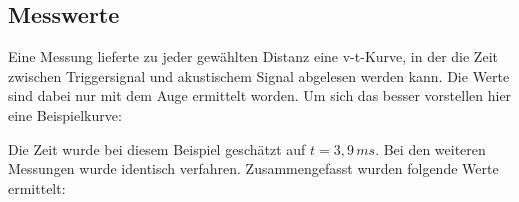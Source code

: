 \subsection{Messwerte}
Eine Messung lieferte zu jeder gewählten Distanz eine v-t-Kurve, in der die Zeit zwischen Triggersignal und akustischem Signal abgelesen werden kann. Die Werte sind dabei nur mit dem Auge ermittelt worden. Um sich das besser vorstellen hier eine Beispielkurve:

\begin{center}
\begin{minipage}{\linewidth}
\centering
{}
\end{minipage}
\label{bsp}
\end{center}
Die Zeit wurde bei diesem Beispiel geschätzt auf \(t = 3,9\, ms\). Bei den weiteren Messungen wurde identisch verfahren.
Zusammengefasst wurden folgende Werte ermittelt:
